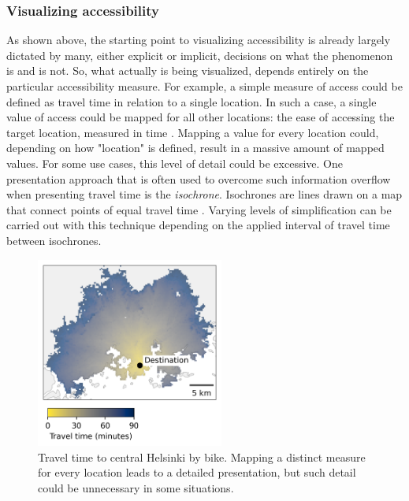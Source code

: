 \subsubsection{Visualizing accessibility}

As shown above,
the starting point to visualizing accessibility is already largely dictated by
many, either explicit or implicit, decisions on what the phenomenon is and is not.
So, what actually is being visualized, depends entirely on
the particular accessibility measure.
For example, a simple measure of access could be defined as
travel time in relation to a single location.
In such a case, a single value of access could be mapped
for all other locations:
the ease of accessing the target location, measured in time .
Mapping a value for every location could,
depending on how "location" is defined,
result in a massive amount of mapped values.
For some use cases, this level of detail could be excessive.
One presentation approach that is often used to overcome
such information overflow when presenting travel time is
the \textit{isochrone}.
Isochrones are lines drawn on a map that
connect points of equal travel time .
Varying levels of simplification can be carried out with this technique
depending on the applied interval of travel time between isochrones.

\begin{figure}[H]
	\centering
	\includegraphics[width=0.55\textwidth]{visual/figures/ttm/tt_surface.png}
	\caption{
		Travel time to central Helsinki by bike.
		Mapping a distinct measure for every location leads to a detailed presentation,
		but such detail could be unnecessary in some situations.
	}
	\label{fig:tt surface}
\end{figure}

